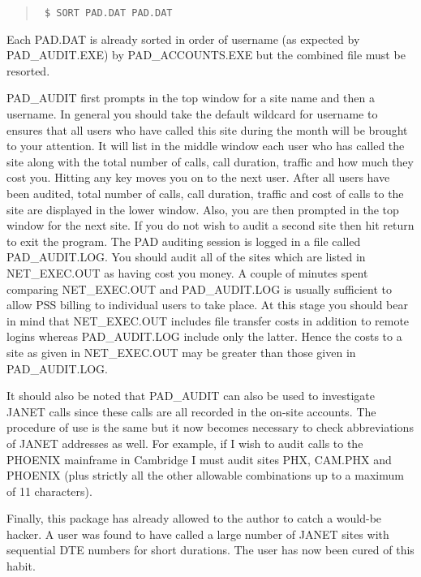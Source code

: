 \begin{enumerate}
\begin{quote} \tt
\$ SORT PAD.DAT PAD.DAT
\end{quote}

Each PAD.DAT is already sorted in order of username (as expected by
PAD\_\/AUDIT.EXE) by PAD\_\/ACCOUNTS.EXE but the combined file must be resorted.

PAD\_\/AUDIT first prompts in the top window for a site name and then a
username. In general you should take the default wildcard for username to
ensures that all users who have called this site during the month will be
brought to your attention. It will list in the middle window each user who
has called the site along with the total number of calls, call duration,
traffic and how much they cost you. Hitting any key moves you on to the next
user. After all users have been audited, total number of calls, call
duration, traffic and cost of calls to the site are displayed in the lower
window. Also, you are then prompted in the top window for the next site. If
you do not wish to audit a second site then hit return to exit the program.
The PAD auditing session is logged in a file called PAD\_\/AUDIT.LOG. You
should audit all of the sites which are listed in NET\_\/EXEC.OUT as having
cost you money. A couple of minutes spent comparing NET\_\/EXEC.OUT and
PAD\_\/AUDIT.LOG is usually sufficient to allow PSS billing to individual users
to take place. At this stage you should bear in mind that NET\_EXEC.OUT
includes file transfer costs in addition to remote logins whereas
PAD\_AUDIT.LOG include only the latter. Hence the costs to a site
as given in NET\_EXEC.OUT may be greater than those given in PAD\_AUDIT.LOG.

It should also be noted that PAD\_\/AUDIT can also be used to investigate JANET
calls since these calls are all recorded in the on-site accounts. The
procedure of use is the same but it now becomes necessary to check
abbreviations of JANET addresses as well. For example, if I wish to audit
calls to the PHOENIX mainframe in Cambridge I must audit sites PHX, CAM.PHX
and PHOENIX (plus strictly all the other allowable combinations up to a
maximum of 11 characters).

Finally, this package has already allowed to the author to catch a would-be
hacker. A user was found to have called a large number of JANET sites
with sequential DTE numbers for short durations. The user has now been
cured of this habit.

\end{enumerate}

